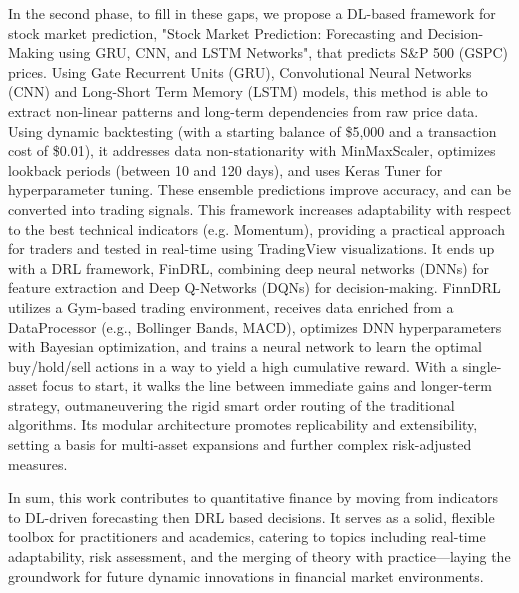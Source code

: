 In the second phase, to fill in these gaps, we propose a DL-based framework for stock market prediction, "Stock Market Prediction: Forecasting and Decision-Making using GRU, CNN, and LSTM Networks", that predicts S\&P 500 (GSPC) prices. Using Gate Recurrent Units (GRU), Convolutional Neural Networks (CNN) and Long-Short Term Memory (LSTM) models, this method is able to extract non-linear patterns and long-term dependencies from raw price data. Using dynamic backtesting (with a starting balance of \$5,000 and a transaction cost of \$0.01), it addresses data non-stationarity with MinMaxScaler, optimizes lookback periods (between 10 and 120 days), and uses Keras Tuner for hyperparameter tuning. These ensemble predictions improve accuracy, and can be converted into trading signals. This framework increases adaptability with respect to the best technical indicators (e.g. Momentum), providing a practical approach for traders and tested in real-time using TradingView visualizations. It ends up with a DRL framework, FinDRL, combining deep neural networks (DNNs) for feature extraction and Deep Q-Networks (DQNs) for decision-making. FinnDRL utilizes a Gym-based trading environment, receives data enriched from a DataProcessor (e.g., Bollinger Bands, MACD), optimizes DNN hyperparameters with Bayesian optimization, and trains a neural network to learn the optimal buy/hold/sell actions in a way to yield a high cumulative reward. With a single-asset focus to start, it walks the line between immediate gains and longer-term strategy, outmaneuvering the rigid smart order routing of the traditional algorithms. Its modular architecture promotes replicability and extensibility, setting a basis for multi-asset expansions and further complex risk-adjusted measures.

In sum, this work contributes to quantitative finance by moving from indicators to DL-driven forecasting then DRL based decisions. It serves as a solid, flexible toolbox for practitioners and academics, catering to topics including real-time adaptability, risk assessment, and the merging of theory with practice—laying the groundwork for future dynamic innovations in financial market environments.

